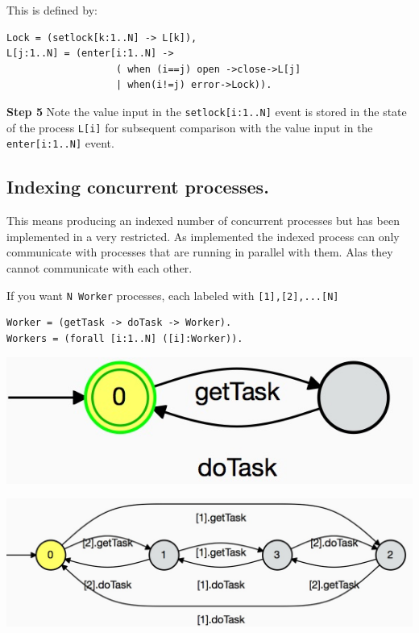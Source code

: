 \documentclass[]{article}
\begin{document}
This is defined by:

\hspace{1in}\begin{minipage}{0.3\textwidth}
\begin{verbatim}
Lock = (setlock[k:1..N] -> L[k]),
L[j:1..N] = (enter[i:1..N] ->
                   ( when (i==j) open ->close->L[j]
                   | when(i!=j) error->Lock)).   \end{verbatim}
\end{minipage}


{\bf Step 5} Note the value input in the \verb$setlock[i:1..N]$ event is stored in the state of the process \verb$L[i]$ for subsequent comparison with the value input in the \verb$enter[i:1..N]$ event.



  \subsection{Indexing concurrent processes.}
  This means producing an indexed number of concurrent processes but has been implemented in a very restricted. As implemented the indexed process can only communicate with processes that are running in parallel with them. Alas they cannot communicate with each other.


  If you want \verb$N Worker$ processes, each  labeled with \verb$[1],[2],...[N]$

 \begin{center}\begin{minipage}{0.55\textwidth}
\begin{verbatim}
Worker = (getTask -> doTask -> Worker).
Workers = (forall [i:1..N] ([i]:Worker)).
   \end{verbatim}
\end{minipage}\begin{minipage}{0.4\textwidth}
\begin{center}\includegraphics[scale=0.3]{Worker.jpg}\end{center}
\end{minipage}

\includegraphics[scale=0.3]{Workers.jpg}
\end{center}
\end{document}
